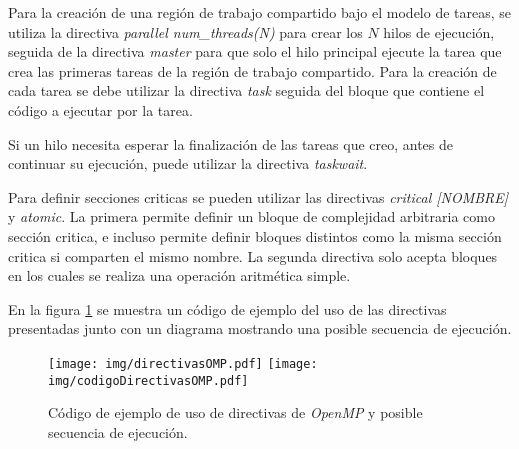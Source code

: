 Para la creación de una región de trabajo compartido bajo el modelo de tareas, se
utiliza la directiva \emph{parallel num\_threads(N)} para crear los $N$ hilos de
ejecución, seguida de la directiva \emph{master} para que solo el hilo principal
ejecute la tarea que crea las primeras tareas de la región de trabajo
compartido. Para la creación de cada tarea se debe utilizar la directiva
\emph{task} seguida del bloque que contiene el código a ejecutar por la tarea.

Si un hilo necesita esperar la finalización de las tareas que creo, antes de
continuar su ejecución, puede utilizar la directiva \emph{taskwait}.

Para definir secciones criticas se pueden utilizar las directivas \emph{critical
[NOMBRE]} y \emph{atomic}. La primera permite definir un bloque de complejidad
arbitraria como sección critica, e incluso permite definir bloques distintos
como la misma sección critica si comparten el mismo nombre. La segunda directiva
solo acepta bloques en los cuales se realiza una operación aritmética simple.

En la figura \ref{directivas} se muestra un código de ejemplo del uso de las
directivas presentadas junto con un diagrama mostrando una posible secuencia
de ejecución.

\begin{figure}[!h]

	\centering

	\texttt{[image: img/directivasOMP.pdf]}
	\texttt{[image: img/codigoDirectivasOMP.pdf]}

	\caption{Código de ejemplo de uso de directivas de \emph{OpenMP} y
	posible secuencia de ejecución.}

	\label{directivas}

\end{figure}
